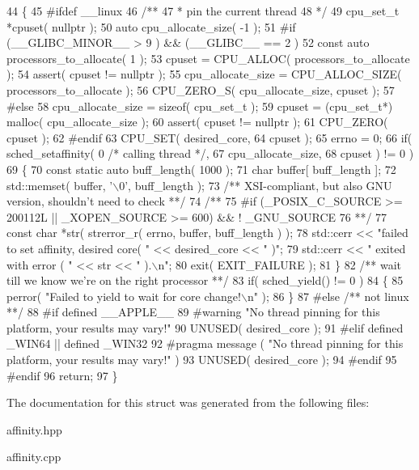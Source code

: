 \begin{DoxyCode}
44 \{
45 \textcolor{preprocessor}{#ifdef \_\_linux}
46 \textcolor{comment}{   /**}
47 \textcolor{comment}{    * pin the current thread }
48 \textcolor{comment}{    */}
49    cpu\_set\_t   *cpuset( \textcolor{keyword}{nullptr} );
50    \textcolor{keyword}{auto} cpu\_allocate\_size( -1 );
51 \textcolor{preprocessor}{#if   (\_\_GLIBC\_MINOR\_\_ > 9 ) && (\_\_GLIBC\_\_ == 2 )}
52    \textcolor{keyword}{const} \textcolor{keyword}{auto}  processors\_to\_allocate( 1 );
53    cpuset = CPU\_ALLOC( processors\_to\_allocate );
54    assert( cpuset != \textcolor{keyword}{nullptr} );
55    cpu\_allocate\_size = CPU\_ALLOC\_SIZE( processors\_to\_allocate );
56    CPU\_ZERO\_S( cpu\_allocate\_size, cpuset );
57 \textcolor{preprocessor}{#else}
58    cpu\_allocate\_size = \textcolor{keyword}{sizeof}( cpu\_set\_t );
59    cpuset = (cpu\_set\_t*) malloc( cpu\_allocate\_size );
60    assert( cpuset != \textcolor{keyword}{nullptr} );
61    CPU\_ZERO( cpuset );
62 \textcolor{preprocessor}{#endif}
63    CPU\_SET( desired\_core,
64             cpuset );
65    errno = 0;
66    \textcolor{keywordflow}{if}( sched\_setaffinity( 0 \textcolor{comment}{/* calling thread */},
67                          cpu\_allocate\_size,
68                          cpuset ) != 0 )
69    \{
70       \textcolor{keyword}{const} \textcolor{keyword}{static} \textcolor{keyword}{auto} buff\_length( 1000 );
71       \textcolor{keywordtype}{char} buffer[ buff\_length ];
72       std::memset( buffer, \textcolor{charliteral}{'\(\backslash\)0'}, buff\_length );\textcolor{comment}{}
73 \textcolor{comment}{      /** XSI-compliant, but also GNU version, shouldn't need to check **/}\textcolor{comment}{}
74 \textcolor{comment}{/**}
75 \textcolor{comment}{#if (\_POSIX\_C\_SOURCE >= 200112L || \_XOPEN\_SOURCE >= 600) && ! \_GNU\_SOURCE}
76 \textcolor{comment}{**/}
77       \textcolor{keyword}{const} \textcolor{keywordtype}{char} *str( strerror\_r( errno, buffer, buff\_length ) );
78       std::cerr << \textcolor{stringliteral}{"failed to set affinity, desired core( "} << desired\_core << \textcolor{stringliteral}{" )"};
79       std::cerr << \textcolor{stringliteral}{" exited with error ( "} << str << \textcolor{stringliteral}{" ).\(\backslash\)n"};
80       exit( EXIT\_FAILURE );
81    \}\textcolor{comment}{}
82 \textcolor{comment}{   /** wait till we know we're on the right processor **/}
83    \textcolor{keywordflow}{if}( sched\_yield() != 0 )
84    \{
85       perror( \textcolor{stringliteral}{"Failed to yield to wait for core change!\(\backslash\)n"} );
86    \}
87 \textcolor{preprocessor}{#else }\textcolor{comment}{/** not linux **/}\textcolor{preprocessor}{}
88 \textcolor{preprocessor}{#if defined \_\_APPLE\_\_}
89 \textcolor{preprocessor}{#warning "No thread pinning for this platform, your results may vary!"}
90 UNUSED( desired\_core );
91 \textcolor{preprocessor}{#elif defined \_WIN64 || defined \_WIN32}
92 \textcolor{preprocessor}{#pragma message ( "No thread pinning for this platform, your results may vary!" )}
93 UNUSED( desired\_core );
94 \textcolor{preprocessor}{#endif}
95 \textcolor{preprocessor}{#endif}
96    \textcolor{keywordflow}{return};
97 \}
\end{DoxyCode}


The documentation for this struct was generated from the following files\+:\begin{DoxyCompactItemize}
\item 
affinity.\+hpp\item 
affinity.\+cpp\end{DoxyCompactItemize}
